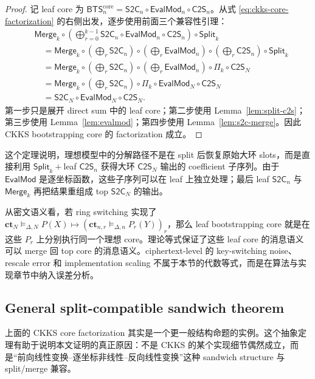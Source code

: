 \documentclass[UTF8,11pt]{article}
\newcommand{\Split}{\mathsf{Split}}
\newcommand{\Merge}{\mathsf{Merge}}
\newcommand{\CtwoS}{\mathsf{C2S}}
\newcommand{\StwoC}{\mathsf{S2C}}
\newcommand{\EvalMod}{\mathsf{EvalMod}}
\newcommand{\BTS}{\mathsf{BTS}}
\newcommand{\ct}{\mathbf{ct}}
\theoremstyle{definition}
\theoremstyle{plain}
\begin{document}
\begin{proof}
记 leaf core 为 \(\BTS_{n}^{\mathrm{core}}=\StwoC_n\circ\EvalMod_n\circ\CtwoS_n\)。从式 \eqref{eq:ckks-core-factorization} 的右侧出发，逐步使用前面三个兼容性引理：
\[
\begin{aligned}
&\Merge_k\circ
\left(
\bigoplus_{r=0}^{k-1}
\StwoC_n\circ\EvalMod_n\circ\CtwoS_n
\right)
\circ\Split_k\\
&\quad=
\Merge_k\circ
\left(\bigoplus_r\StwoC_n\right)
\circ
\left(\bigoplus_r\EvalMod_n\right)
\circ
\left(\bigoplus_r\CtwoS_n\right)
\circ\Split_k\\
&\quad=
\Merge_k\circ
\left(\bigoplus_r\StwoC_n\right)
\circ
\left(\bigoplus_r\EvalMod_n\right)
\circ
\Pi_k\circ\CtwoS_N\\
&\quad=
\Merge_k\circ
\left(\bigoplus_r\StwoC_n\right)
\circ
\Pi_k\circ\EvalMod_N\circ\CtwoS_N\\
&\quad=
\StwoC_N\circ\EvalMod_N\circ\CtwoS_N.
\end{aligned}
\]
第一步只是展开 direct sum 中的 leaf core；第二步使用 Lemma~\ref{lem:split-c2s}；第三步使用 Lemma~\ref{lem:evalmod}；第四步使用 Lemma~\ref{lem:s2c-merge}。因此 CKKS bootstrapping core 的 factorization 成立。
\end{proof}

这个定理说明，理想模型中的分解路径不是在 split 后恢复原始大环 slots，而是直接利用 \(\Split_k+\)leaf \(\CtwoS_n\) 获得大环 \(\CtwoS_N\) 输出的 coefficient 子序列。由于 \(\EvalMod\) 是逐坐标函数，这些子序列可以在 leaf 上独立处理；最后 leaf \(\StwoC_n\) 与 \(\Merge_k\) 再把结果重组成 top \(\StwoC_N\) 的输出。

从密文语义看，若 ring switching 实现了 \(\ct_N\vDash_{\Delta,N}P(X)\mapsto(\ct_{n,r}\vDash_{\Delta,n}P_r(Y))_r\)，那么 leaf bootstrapping core 就是在这些 \(P_r\) 上分别执行同一个理想 core。理论等式保证了这些 leaf core 的消息语义可以 merge 回 top core 的消息语义。ciphertext-level 的 key-switching noise、rescale error 和 implementation scaling 不属于本节的代数等式，而是在算法与实现章节中纳入误差分析。

\subsection{General split-compatible sandwich theorem}
\label{subsec:general-sandwich-theorem}

上面的 CKKS core factorization 其实是一个更一般结构命题的实例。这个抽象定理有助于说明本文证明的真正原因：不是 CKKS 的某个实现细节偶然成立，而是“前向线性变换--逐坐标非线性--反向线性变换”这种 sandwich structure 与 split/merge 兼容。
\end{document}
